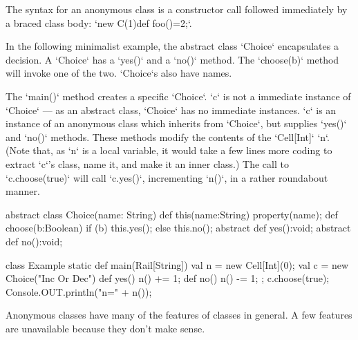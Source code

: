 The syntax for an anonymous class is a constructor call followed immediately
by a braced class body: \xcd`new C(1){def foo()=2;}`.

\begin{ex}In the following minimalist example, the abstract class \xcd`Choice`
encapsulates a decision.   A \xcd`Choice` has a \xcd`yes()` and a \xcd`no()`
method.  The \xcd`choose(b)` method will invoke one of the two.  \xcd`Choice`s
also have names.

The \xcd`main()` method creates a specific \xcd`Choice`.  \xcd`c` is not a
immediate instance of \xcd`Choice` --- as an abstract class, \xcd`Choice` has
no immediate instances. \xcd`c` is an instance of an anonymous class which
inherits from \xcd`Choice`, but supplies \xcd`yes()` and \xcd`no()` methods.
These methods modify the contents of the \xcd`Cell[Int]` \xcd`n`.  (Note that,
as \xcd`n` is a local variable, it would take a few lines more coding to
extract \xcd`c`'s class, name it, and make it an inner class.)  The call to
\xcd`c.choose(true)`  will call \xcd`c.yes()`, incrementing \xcd`n()`, in a
rather roundabout manner.

\begin{xten}
abstract class Choice(name: String) {
  def this(name:String) {property(name);}
  def choose(b:Boolean) { 
     if (b) this.yes(); else this.no(); }
  abstract def yes():void;
  abstract def no():void;
}

class Example {
  static def main(Rail[String]) {
    val n = new Cell[Int](0);
    val c = new Choice("Inc Or Dec") {
      def yes() { n() += 1; }
      def no()  { n() -= 1; }
      };
    c.choose(true);
    Console.OUT.println("n=" + n());
  }
}

\end{xten}
%
\end{ex}

Anonymous classes have many of the features of classes in general.  A few
features are unavailable because they don't make sense.

